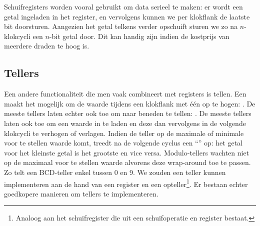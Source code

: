 Schuifregisters worden vooral gebruikt om data serieel te maken: er wordt een getal ingeladen in het register, en vervolgens kunnen we per klokflank de laatste bit doorsturen. Aangezien het getal telkens verder opschuift sturen we zo na $n$-klokcycli een $n$-bit getal door. Dit kan handig zijn indien de kostprijs van meerdere draden te hoog is.
\subsection{Tellers}
\label{ss:counters}
Een andere functionaliteit die men vaak combineert met registers is tellen. Een  maakt het mogelijk om de waarde tijdens een klokflank met \'e\'en op te hogen: . De meeste tellers laten echter ook toe om naar beneden te tellen: . De meeste tellers laten ook toe om een waarde in te laden en deze dan vervolgens in de volgende klokcycli te verhogen of verlagen. Indien de teller op de maximale of minimale voor te stellen waarde komt, treedt na de volgende cyclus een ``'' op: het getal voor het kleinste getal is het grootste en vice versa. Modulo-tellers wachten niet op de maximaal voor te stellen waarde alvorens deze wrap-around toe te passen. Zo telt een BCD-teller enkel tussen 0 en 9. We zouden een teller kunnen implementeren aan de hand van een register en een opteller\footnote{Analoog aan het schuifregister die uit een schuifoperatie en register bestaat.}. Er bestaan echter goedkopere manieren om tellers te implementeren.
